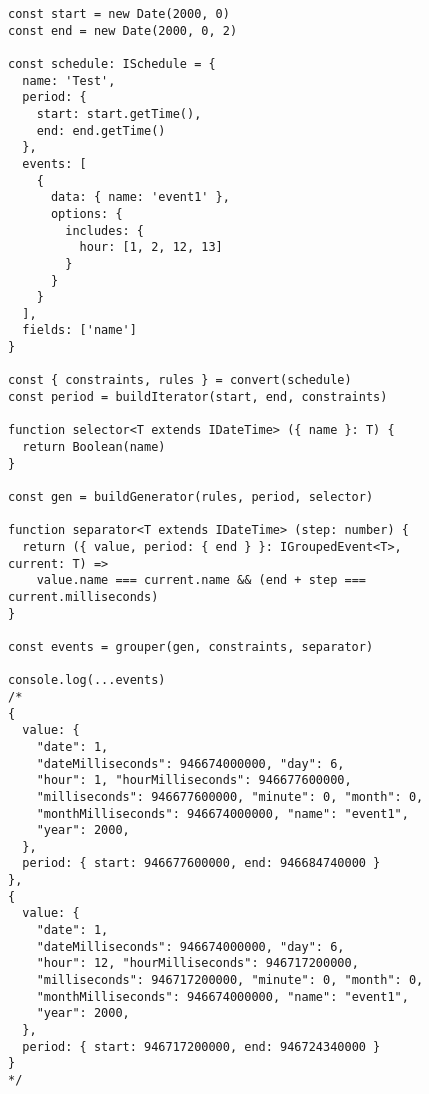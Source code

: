  \hypertarget{app:D}{\label{app:D}}


{
\small
\begin{Verbatim}[frame=single]
const start = new Date(2000, 0)
const end = new Date(2000, 0, 2)

const schedule: ISchedule = {
  name: 'Test',
  period: {
    start: start.getTime(),
    end: end.getTime()
  },
  events: [
    {
      data: { name: 'event1' },
      options: {
        includes: {
          hour: [1, 2, 12, 13]
        }
      }
    }
  ],
  fields: ['name']
}

const { constraints, rules } = convert(schedule)
const period = buildIterator(start, end, constraints)

function selector<T extends IDateTime> ({ name }: T) {
  return Boolean(name)
}

const gen = buildGenerator(rules, period, selector)

function separator<T extends IDateTime> (step: number) {
  return ({ value, period: { end } }: IGroupedEvent<T>,
current: T) =>
    value.name === current.name && (end + step ===
current.milliseconds)
}

const events = grouper(gen, constraints, separator)

console.log(...events)
/*
{
  value: {
    "date": 1,
    "dateMilliseconds": 946674000000, "day": 6,
    "hour": 1, "hourMilliseconds": 946677600000,
    "milliseconds": 946677600000, "minute": 0, "month": 0,
    "monthMilliseconds": 946674000000, "name": "event1",
    "year": 2000,
  },
  period: { start: 946677600000, end: 946684740000 }
},
{
  value: {
    "date": 1,
    "dateMilliseconds": 946674000000, "day": 6,
    "hour": 12, "hourMilliseconds": 946717200000,
    "milliseconds": 946717200000, "minute": 0, "month": 0,
    "monthMilliseconds": 946674000000, "name": "event1",
    "year": 2000,
  },
  period: { start: 946717200000, end: 946724340000 }
}
*/
\end{Verbatim}
}


\clearpage